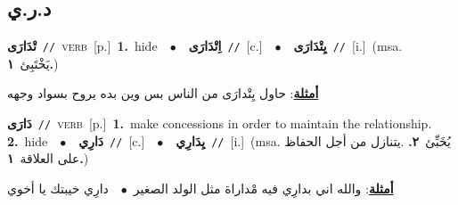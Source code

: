 \documentclass[10pt,a4paper,twoside]{article} %
\begin{document}
\begin{multicols}{2}
\vspace{-3mm}
\subsection*{\color{blue}\foreignlanguage{arabic}{د.ر.ي}\color{blue}{}} 

{\setlength\topsep{0pt}\textbf{\foreignlanguage{arabic}{تْدَارَى}}\ {\color{gray}\texttt{//}\color{black}}\ \textsc{verb}\ [p.]\ \textbf{1.}~hide\ \ $\bullet$\ \ \setlength\topsep{0pt}\textbf{\foreignlanguage{arabic}{اِتْدَارَى}}\ {\color{gray}\texttt{//}\color{black}}\ [c.]\ \ $\bullet$\ \ \setlength\topsep{0pt}\textbf{\foreignlanguage{arabic}{يِتْدَارَى}}\ {\color{gray}\texttt{//}\color{black}}\ [i.]\ \color{gray}(msa. \foreignlanguage{arabic}{يَخْتَبِئ}~\foreignlanguage{arabic}{\textbf{١.}})\color{black}\  \begin{flushright}\color{gray}\foreignlanguage{arabic}{\textbf{\underline{\foreignlanguage{arabic}{أمثلة}}}: حاول يِتْدارَى من الناس بس وين بده يروح بسواد وجهه}\end{flushright}\color{black}} \vspace{2mm}

{\setlength\topsep{0pt}\textbf{\foreignlanguage{arabic}{دَارَى}}\ {\color{gray}\texttt{//}\color{black}}\ \textsc{verb}\ [p.]\ \textbf{1.}~make concessions in order to maintain the relationship.  \textbf{2.}~hide\ \ $\bullet$\ \ \setlength\topsep{0pt}\textbf{\foreignlanguage{arabic}{دَارِي}}\ {\color{gray}\texttt{//}\color{black}}\ [c.]\ \ $\bullet$\ \ \setlength\topsep{0pt}\textbf{\foreignlanguage{arabic}{يِدَارِي}}\ {\color{gray}\texttt{//}\color{black}}\ [i.]\ \color{gray}(msa. \foreignlanguage{arabic}{يُخَبِّئ}~\foreignlanguage{arabic}{\textbf{٢.}}  .\foreignlanguage{arabic}{يتنازل من أجل الحفاظ على العلاقة}~\foreignlanguage{arabic}{\textbf{١.}})\color{black}\  \begin{flushright}\color{gray}\foreignlanguage{arabic}{\textbf{\underline{\foreignlanguage{arabic}{أمثلة}}}: والله اني بدارِي فيه مْداراة مثل الولد الصغير\ $\bullet$\ \  دارِي خيبتك يا أخوي}\end{flushright}\color{black}} \vspace{2mm}


\end{multicols}
\end{document}
